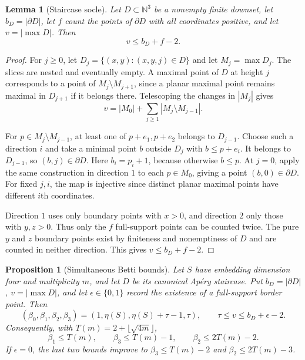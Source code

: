 \documentclass[11pt]{article}
\newtheorem{lemma}[theorem]{Lemma}
\newtheorem{proposition}[theorem]{Proposition}
\theoremstyle{definition}
\theoremstyle{remark}
\theoremstyle{plain}
\begin{document}
\begin{lemma}[Staircase socle]\label{lem:socle}
Let $D\subset\mathbb N^3$ be a nonempty finite downset, let
$b_D=|\partial D|$, let $f$ count the points of $\partial D$ with all
coordinates positive, and let $v=|\max D|$.  Then
\[
v\le b_D+f-2.
\]\end{lemma}
\begin{proof}
For $j\ge0$, let $D_j=\{(x,y):(x,y,j)\in D\}$ and let
$M_j=\max D_j$. The slices are nested and eventually empty.
A maximal point of $D$ at height $j$ corresponds to a point of
$M_j\setminus M_{j+1}$, since a planar maximal point remains maximal in
$D_{j+1}$ if it belongs there. Telescoping the changes in $|M_j|$ gives
\[
 v=|M_0|+\sum_{j\ge1}|M_j\setminus M_{j-1}|.
\]

For $p\in M_j\setminus M_{j-1}$, at least one of $p+e_1,p+e_2$
belongs to $D_{j-1}$. Choose such a direction $i$ and take a minimal
point $b$ outside $D_j$ with $b\le p+e_i$. It belongs to $D_{j-1}$,
so $(b,j)\in\partial D$. Here $b_i=p_i+1$, because otherwise $b\le p$.
At $j=0$, apply the same construction in direction $1$ to each
$p\in M_0$, giving a point $(b,0)\in\partial D$.
For fixed $j,i$, the map is injective since distinct planar maximal points have
different $i$th coordinates.

Direction $1$ uses only boundary points with $x>0$, and direction $2$
only those with $y,z>0$. Thus only the $f$ full-support points can
be counted twice. The pure $y$ and $z$ boundary points exist by finiteness
and nonemptiness of $D$ and are counted in neither direction. This gives
$v\le b_D+f-2$.
\end{proof}

\medskip
\begin{proposition}[Simultaneous Betti bounds]\label{prop:betti}
Let $S$ have embedding dimension four and multiplicity $m$, and let
$D$ be its canonical Ap\'ery staircase.  Put $b_D=|\partial D|$,
$v=|\max D|$, and let $\epsilon\in\{0,1\}$ record the existence of a
full-support border point.  Then
\[
(\beta_0,\beta_1,\beta_2,\beta_3)
 = (1,\eta(S),\eta(S)+\tau-1,\tau),
\qquad
\tau\le v\le b_D+\epsilon-2.
\]
Consequently, with $T(m)=2+\lfloor\sqrt{4m}\rfloor$,
\[
\beta_1\le T(m),\qquad
\beta_3\le T(m)-1,\qquad
\beta_2\le 2T(m)-2.
\]
If $\epsilon=0$, the last two bounds improve to
$\beta_3\le T(m)-2$ and $\beta_2\le2T(m)-3$.\end{proposition}
\end{document}
